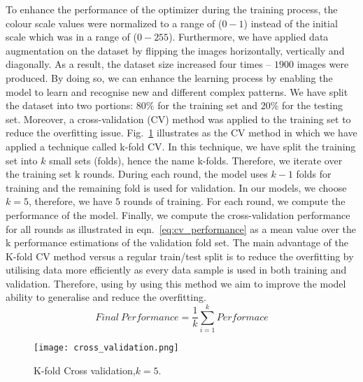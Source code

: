 To enhance the performance of the optimizer during the training process, the colour scale values were normalized to a range of (\(0-1\)) instead of the initial scale which was in a range of (\(0 - 255\)).	
Furthermore, we have applied data augmentation on the dataset by flipping the images horizontally, vertically and diagonally. 
As a result, the dataset size increased four times -- \(1900\)  images were produced.
By doing so, we can enhance the learning process by enabling the model to learn and recognise new and different complex patterns.
We have split the dataset into two portions:  \(80\%\) for the training set and \(20\%\) for the testing set.
Moreover, a cross-validation (CV) method was applied to the training set to reduce the overfitting issue. 
Fig.~\ref{fig:Cross_validation} illustrates as the CV method in which  we have applied a technique called k-fold CV.
In this technique, we have split the training set into \(k\) small sets (folds), hence the name k-folds. 
Therefore, we iterate over the training set k rounds.
During each round, the model uses  \(k-1\) folds for training and the remaining fold is used for validation. 
In our models, we choose \(k=5\), therefore, we have \(5\) rounds of training. 
For each round, we compute the performance of the model.
Finally, we compute the cross-validation performance for all rounds as illustrated in eqn.~\ref{eq:cv_performance} as a mean value over the k performance estimations of the validation fold set.
The main advantage of the K-fold CV method versus a regular train/test split is to reduce the overfitting by utilising data more efficiently as every data sample is used in both training and validation. 
Therefore, using by using this method we aim to improve the model ability to generalise and reduce the overfitting.
\begin{equation}
Final \ Performance = \frac{1}{k}\sum_{i=1}^{k}Performace
\label{eq:cv_performance}
\end{equation}
\begin{figure}
	\centering
	\texttt{[image: cross\_validation.png]}
	\caption{K-fold Cross validation,\(k=5\).}
	\label{fig:Cross_validation}
\end{figure}
